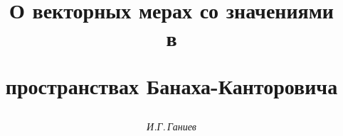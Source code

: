 

 


%  


 


\newcommand{\dom}{\operatorname{dom}} 


\newcommand{\tts}[1]{} 


 




  


\setcounter{page}{65} 












 


\author{\it И.Г.\,Ганиев } 




\title{О векторных мерах со значениями\\ в  


пространствах Банаха-Канторовича} 


 


\date{} 




\pagestyle{plain} %


 




\maketitle 


